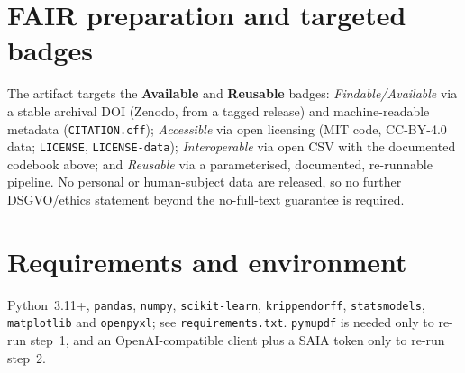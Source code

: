 \documentclass[english,biblatex]{lni}
\begin{document}
\section{FAIR preparation and targeted badges}
The artifact targets the \textbf{Available} and \textbf{Reusable} badges:
\emph{Findable/Available} via a stable archival DOI (Zenodo, from a tagged release)
and machine-readable metadata (\texttt{CITATION.cff}); \emph{Accessible} via open
licensing (MIT code, CC-BY-4.0 data; \texttt{LICENSE}, \texttt{LICENSE-data});
\emph{Interoperable} via open CSV with the documented codebook above; and
\emph{Reusable} via a parameterised, documented, re-runnable pipeline. No personal or human-subject data are released, so no further
DSGVO/ethics statement beyond the no-full-text guarantee is required.

\section{Requirements and environment}
Python~3.11+, \texttt{pandas}, \texttt{numpy}, \texttt{scikit-learn},
\texttt{krippendorff}, \texttt{statsmodels}, \texttt{matplotlib} and
\texttt{openpyxl}; see \texttt{requirements.txt}. \texttt{pymupdf} is needed only to
re-run step~1, and an OpenAI-compatible client plus a SAIA token only to re-run
step~2.

\nocite{rseInDelfiArtifact}
\printbibliography
\end{document}
